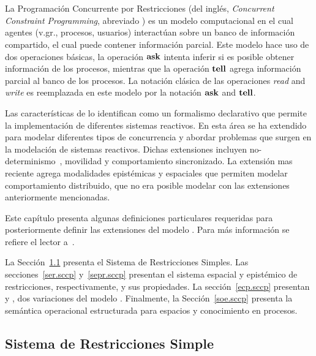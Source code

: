 \chapter{\SCCP}
\label{chapter.sccp}      

La Programaci\'on Concurrente por Restricciones (del ingl\'es, \textit{Concurrent Constraint Programming}, abreviado \textbf{\CCP}) es un modelo computacional en el cual agentes (v.gr., procesos, usuarios) interact\'uan sobre un banco de informaci\'on compartido, el cual puede contener informaci\'on parcial. Este modelo hace uso de dos operaciones b\'asicas, la operaci\'on ${\bf ask}$ intenta inferir si es posible obtener informaci\'on de los procesos, mientras que la operaci\'on ${\bf tell}$ agrega informaci\'on parcial al banco de los procesos. La notaci\'on cl\'asica de las operaciones \textit{read} and \textit{write} es reemplazada en este modelo por la notaci\'on ${\bf ask}$ and ${\bf tell}$. 

Las caracter\'isticas de \textbf{\CCP} lo identifican como un formalismo declarativo que permite la implementaci\'on de diferentes sistemas reactivos. En esta \'area \textbf{\CCP} se ha extendido para modelar diferentes tipos de concurrencia y abordar problemas que surgen en la modelaci\'on de sistemas reactivos. Dichas extensiones incluyen no-determinismo~\cite{Nielsen:2002:TCC:643009.643014}, movilidad y comportamiento sincronizado. La extensi\'on mas reciente agrega modalidades epist\'emicas y espaciales que permiten modelar comportamiento distribuido, que no era posible modelar con las extensiones anteriormente mencionadas.

Este cap\'itulo presenta algunas definiciones particulares requeridas para posteriormente definir las extensiones del modelo \textbf{\CCP}. Para m\'as informaci\'on se refiere el lector a~\cite{knight:hal-00761116}.

La Secci\'on~\ref{srs.sccp} presenta el Sistema de Restricciones Simples. Las secciones~\ref{ser.sccp} y~\ref{sepr.sccp} presentan el sistema espacial y epist\'emico de restricciones, respectivamente, y sus propiedades. La secci\'on~\ref{ecp.sccp} presentan \SCCP y \ECCP, dos variaciones del modelo \CCP. Finalmente, la Secci\'on~\ref{soe.sccp} presenta la sem\'antica operacional estructurada para espacios y conocimiento en procesos.

\section{Sistema de Restricciones Simple}
\label{srs.sccp}

